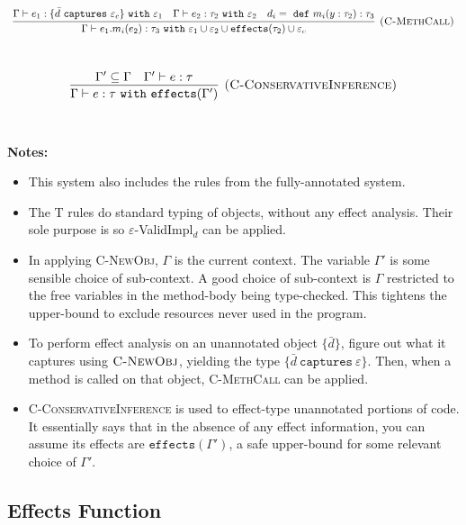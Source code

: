 \documentclass{llncs}
\newcommand{\keywadj}[1]{\mathtt{#1}}
\newcommand{\keyw}[1]{\keywadj{#1}~}
\begin{document}
\[
\begin{array}{c}
\infer[\textsc{(C-MethCall)}]
	{\Gamma \vdash e_1.m_i(e_2) : \tau_3~ \keyw{with} \varepsilon_1 \cup \varepsilon_2 \cup \keywadj{effects}(\tau_2) \cup \varepsilon_c}
	{\Gamma \vdash e_1 : \{ \bar d~\keyw{captures} \varepsilon_c \}~\keyw{with} \varepsilon_1 & \Gamma \vdash e_2:\tau_2~\keyw{with} \varepsilon_2&d_i =~\keyw{def} m_i(y:\tau_2):\tau_3 } \\[5ex]
\end{array}
\]

\[
\begin{array}{c}
\infer[\textsc{(C-ConservativeInference)}]
	{\Gamma \vdash e : \tau ~\keyw{with} \keywadj{effects}(\Gamma') }
	{\Gamma' \subseteq \Gamma & \Gamma' \vdash e : \tau } \\[5ex]
\end{array}
\]

\noindent \textbf{Notes:}

\begin{itemize}
	\item This system also includes the rules from the fully-annotated system.
	\item The \textsc{T} rules do standard typing of objects, without any effect analysis. Their sole purpose is so $\varepsilon$-ValidImpl$_d$ can be applied.
	\item In applying \textsc{C-NewObj}, $\Gamma$ is the current context. The variable $\Gamma'$ is some sensible choice of sub-context. A good choice of sub-context is $\Gamma$ restricted to the free variables in the method-body being type-checked. This tightens the upper-bound to exclude resources never used in the program.
	\item To perform effect analysis on an unannotated object $\{ \bar d \}$, figure out what it captures using $\textsc{C-NewObj}$, yielding the type $\{ \bar d~\keyw{captures} \varepsilon \}$. Then, when a method is called on that object, \textsc{C-MethCall} can be applied.
	\item \textsc{C-ConservativeInference} is used to effect-type unannotated portions of code. It essentially says that in the absence of any effect information, you can assume its effects are $\keywadj{effects(\Gamma')}$, a safe upper-bound for some relevant choice of $\Gamma'$.
\end{itemize}

\subsection{Effects Function}
\end{document}
